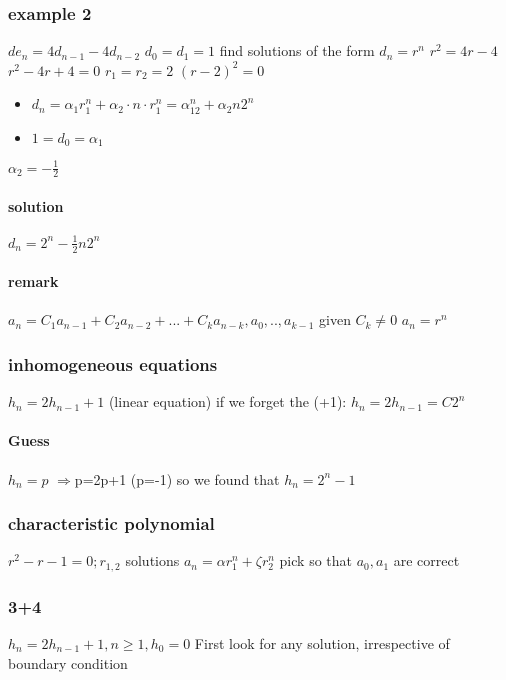 \documentclass[a4paper,10pt]{article}
\begin{document}
\subsubsection{example 2}
$de_n=4d_{n-1}-4d_{n-2}$ $d_0=d_1=1$
\newline
find solutions of the form $d_n=r^n$
\newline
$r^2=4r-4$
\newline
$r^2-4r+4=0$
\newline
$r_1=r_2=2$
\newline
$(r-2)^2=0$
\begin{itemize}
 \item $d_n=\alpha_1r_1^n+\alpha_2\cdot n\cdot r_1^n=\alpha_12^n+\alpha_2n2^n$
 \item $1=d_0=\alpha_1$
\end{itemize}
$\alpha_2=-\frac{1}{2}$
\paragraph{solution}
$d_n=2^n-\frac{1}{2}n2^n$
\paragraph{remark}
$a_n=C_1a_{n-1}+C_2a_{n-2}+...+C_ka_{n-k},a_0,..,a_{k-1}$ given $C_k\neq 0$
\newline
$a_n=r^n$
\subsubsection{inhomogeneous equations}
$h_n=2h_{n-1}+1$ (linear equation)
\newline
if we forget the (+1): $h_n=2h_{n-1}=C2^n$
\paragraph{Guess}
$h_n=p$
\newline
$\Rightarrow$p=2p+1 (p=-1)
\newline
so we found that $h_n=2^n-1$
\subsubsection{characteristic polynomial}
$r^2-r-1=0;r_{1,2}$ solutions
\newline
$a_n=\alpha r_1^n+\zeta r_2^n$
\newline
pick so that $a_0,a_1$ are correct
\subsubsection{3+4}
$h_n=2h_{n-1}+1,n\geq 1,h_0=0$
\newline
First look for any solution, irrespective of boundary condition
\end{document}
